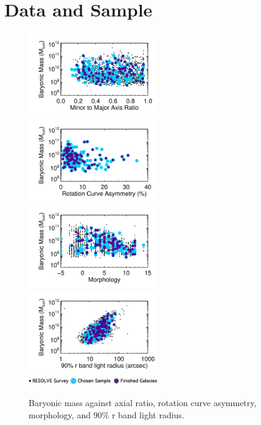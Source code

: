 \documentclass{emulateapj}
\begin{document}
\section{Data and Sample}

\begin{figure}
\includegraphics[width=0.5\textwidth]{naxisratio-eps-converted-to.pdf}
\includegraphics[width=0.5\textwidth]{nasymHa-eps-converted-to.pdf}
\includegraphics[width=0.5\textwidth]{nmorph-eps-converted-to.pdf}
\includegraphics[width=0.5\textwidth]{nradr90p-eps-converted-to.pdf}
\includegraphics[width=0.5\textwidth]{stuff-Recovered-eps-converted-to.pdf}
\caption{Baryonic mass against axial ratio, rotation curve asymmetry, morphology, and 90\% r band light radius. \label{fig:test}}
\end{figure}
\end{document}

